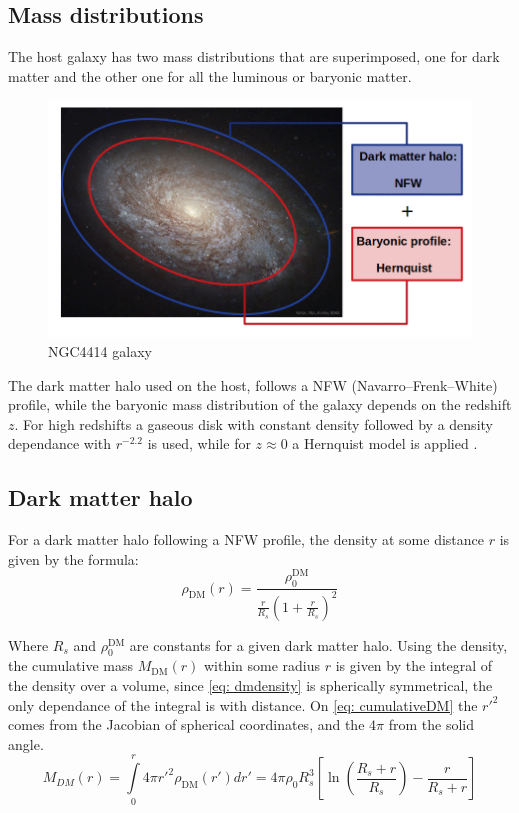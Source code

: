 		
	\subsection{Mass distributions}
		The host galaxy has two mass distributions that are superimposed, one for dark matter and the other one for all the luminous or baryonic matter.
		\begin{figure}[h]
			\centering
			\includegraphics[width=0.7\linewidth]{Figures/NGC4414_modified}
			\caption{NGC4414 galaxy }
		\end{figure}
	
		The dark matter halo used on the host, follows a NFW (Navarro–Frenk–White) profile, while the baryonic mass distribution of the galaxy depends on the redshift $z$. For high redshifts a gaseous disk with constant density followed by a density dependance with $r^{-2.2}$ is used, while for $z \approx 0$ a Hernquist model is applied \cite{choksi2017recoiling}.
		
	\subsection{Dark matter halo}
		For a dark matter halo following a NFW profile, the density at some distance $r$ is given by the formula:
		\begin{equation}\label{eq: dmdensity}
			\rho_\text{DM}(r) = \dfrac{\rho_0^\text{DM}}{\frac{r}{R_s}\left(1 + \frac{r}{R_s}\right)^2}
		\end{equation}
		
		Where $R_s$ and $\rho_0^\text{DM}$ are constants for a given dark matter halo. Using the density, the cumulative mass $M_\text{DM}(r)$ within some radius $r$ is given by the integral of the density over a volume, since \autoref{eq: dmdensity} is spherically symmetrical, the only dependance of the integral is with distance. On \autoref{eq: cumulativeDM} the $r'^2$ comes from the Jacobian of spherical coordinates, and the $4\pi$ from the solid angle.
		\begin{equation}\label{eq: cumulativeDM}
			M_{DM}(r) = \int\limits_0^{r} 4\pi {r'}^2\rho_\text{DM}(r')dr' = 4\pi\rho_0R_s^3\left[\ln\left(\dfrac{R_s + r}{R_s}\right) - \dfrac{r}{R_s + r}\right]
		\end{equation}
		
